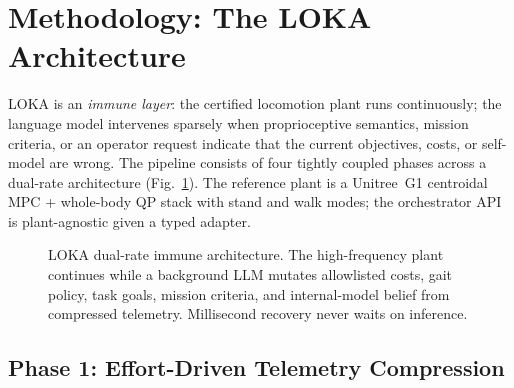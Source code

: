 \section{Methodology: The LOKA Architecture}
\label{sec:method}

LOKA is an \emph{immune layer}: the certified locomotion plant runs continuously; the language model intervenes sparsely when proprioceptive semantics, mission criteria, or an operator request indicate that the current objectives, costs, or self-model are wrong.
The pipeline consists of four tightly coupled phases across a dual-rate architecture (Fig.~\ref{fig:architecture}).
The reference plant is a Unitree~G1 centroidal MPC + whole-body QP stack with stand and walk modes; the orchestrator API is plant-agnostic given a typed adapter.

\begin{figure}[t]
  \centering
  \caption{LOKA dual-rate immune architecture.
  The high-frequency plant continues while a background LLM mutates allowlisted costs, gait policy, task goals, mission criteria, and internal-model belief from compressed telemetry.
  Millisecond recovery never waits on inference.}
  \label{fig:architecture}
\end{figure}

\subsection{Phase 1: Effort-Driven Telemetry Compression}
\label{sec:telemetry}

